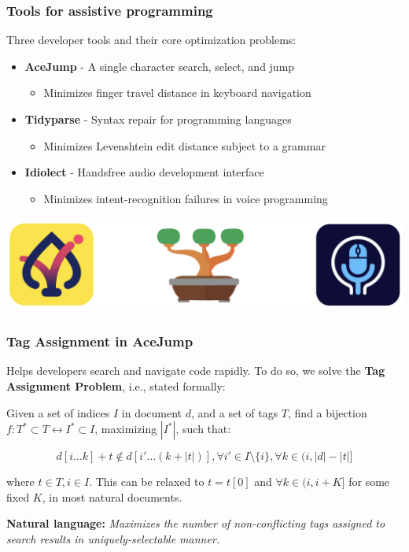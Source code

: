 \documentclass[mathserif,notheorems]{beamer}
\theoremstyle{plain} %
\theoremstyle{definition} %
\begin{document}
\begin{frame}
  \frametitle{Tools for assistive programming}
  Three developer tools and their core optimization problems:\vspace{10pt}

  \begin{itemize}
    \item \textbf{AceJump} - A single character search, select, and jump
    \begin{itemize}\item Minimizes finger travel distance in keyboard navigation\end{itemize}
    \item \textbf{Tidyparse} - Syntax repair for programming languages
    \begin{itemize}\item Minimizes Levenshtein edit distance subject to a grammar\end{itemize}
    \item \textbf{Idiolect} - Handsfree audio development interface
    \begin{itemize}\item Minimizes intent-recognition failures in voice programming\end{itemize}
  \end{itemize}
  \vspace{10pt}
  \begin{center}\includegraphics[scale=0.20]{icons}\end{center}
\end{frame}

\begin{frame}
  \frametitle{Tag Assignment in AceJump}
  Helps developers search and navigate code rapidly. To do so, we solve the \textbf{Tag Assignment Problem}, i.e., stated formally:

\vspace{10pt}
  Given a set of indices $I$ in document $d$, and a set of tags $T$, find a bijection $f: T^*\subset T \leftrightarrow I^*\subset I$, maximizing $|I^*|$, such that:

  \begin{equation*}
    d[i\ldots k] + t \notin d[i'\ldots(k + |t|)], \forall i' \in I\setminus\{i\}, \forall k \in (i, |d| - |t|]
  \end{equation*}

 where $t \in T, i \in I$. This can be relaxed to $t=t[0]$ and $\forall k \in (i, i+K]$ for some fixed $K$, in most natural documents.

  \vspace{10pt}
  \textbf{Natural language:}
  \textit{Maximizes the number of non-conflicting tags assigned to search results in uniquely-selectable manner.}
\end{frame}
\end{document}
